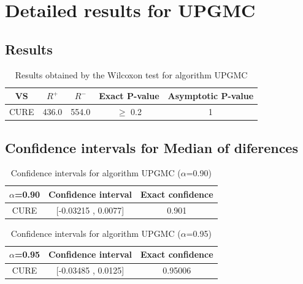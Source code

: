 \documentclass[a4paper,10pt]{article}
\begin{document}
 \clearpage 


\section{Detailed results for UPGMC}


\subsection{Results}

\begin{table}[!htp]
\centering\small
\begin{tabular}{
|c|c|c|c|c|}
\hline
 VS & $R^{+}$ & $R^{-}$ & Exact P-value & Asymptotic P-value \\ \hline 
CURE & 436.0 & 554.0 & $\geq$ 0.2 & 1\\ \hline 

\end{tabular}
\caption{Results obtained by the Wilcoxon test for algorithm UPGMC}
\end{table}

\subsection{Confidence intervals for Median of diferences}

\begin{table}[!htp]
\centering\small
\begin{tabular}{
|c|c|c|}
\hline
 $\alpha$=0.90 & Confidence interval & Exact confidence \\ \hline 
CURE & [-0.03215 , 0.0077] & 0.901\\ \hline 

\end{tabular}
\caption{Confidence intervals for algorithm UPGMC ($\alpha$=0.90)}
\end{table}
\begin{table}[!htp]
\centering\small
\begin{tabular}{
|c|c|c|}
\hline
 $\alpha$=0.95 & Confidence interval & Exact confidence \\ \hline 
CURE & [-0.03485 , 0.0125] & 0.95006\\ \hline 

\end{tabular}
\caption{Confidence intervals for algorithm UPGMC ($\alpha$=0.95)}
\end{table}

 \clearpage 
\end{document}
